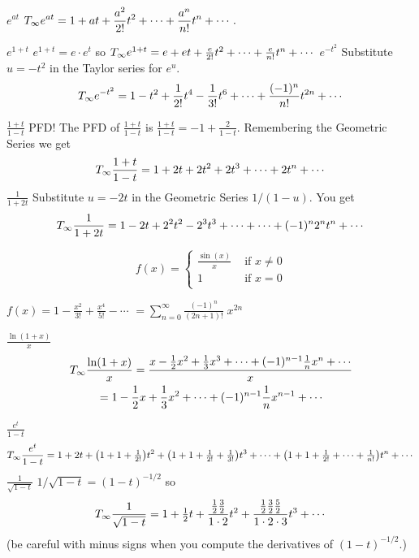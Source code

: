 \begin{multicols}{2}
\problem \(\displaystyle e^{at} \) %
\answer %
\(\displaystyle T_{\infty} e^{at} = 1 + at + \frac{a^2}{2!}t^2 + \cdots +
\frac{a^n}{n!}t^n+\cdots .\)
\endanswer

\problem \(\displaystyle e^{1+t}\) %
\answer %
$e^{1+t} = e\cdot e^t$ so $T_{\infty} e^{1+t} = e + et + \frac e{2!} t^2 +
\cdots + \frac{e}{n!}t^n + \cdots$
\endanswer
\problem \(\displaystyle e^{-t^2}\) %
\answer %
Substitute $u=-t^2$ in the Taylor series for $e^u$.
\[
T_{\infty} e^{-t^2} = 1-t^2+\frac1{2!}t^4-\frac1{3!}t^6+\cdots+
\frac{(-1)^n}{n!}t^{2n} + \cdots
\]
\endanswer

\problem \(\displaystyle \frac{1+t}{1-t} \) %
\answer %
PFD!  The PFD of $\frac{1+t}{1-t}$ is $\frac{1+t}{1-t} = -1 +
\frac2{1-t}$.  Remembering the Geometric Series we  get
\[
T_{\infty} \frac{1+t}{1-t} = 1 + 2t + 2t^2+2t^3+\cdots +2t^n+\cdots
\]
\endanswer
\problem \(\displaystyle \frac1{1+2t}\) %
\answer %
Substitute $u=-2t$ in the Geometric Series $1/(1-u)$.  You get
\[
T_{\infty} \frac1{1+2t} = 1-2t+2^2t^2-2^3t^3 + \cdots + \cdots + (-1)^n2^n t^n
+\cdots
\]
\endanswer

\problem %
$$f(x)=\left\{
\begin{array}{cl}
\frac{\sin(x)}{x} & \mbox{ if $x\neq 0$} \\ 
1 & \mbox{ if $x=0$} \\  
\end{array}\right.$$

\answer $f(x)=1-\frac{x^2}{3!}+ \frac{x^4}{5!}-\cdots$ %
$=\sum_{n=0}^\infty \frac{(-1)^n}{(2n+1)!}\;{x^{2n}}$
\endanswer

\problem \(\displaystyle \frac{\ln (1+x)}{x}\) %
\answer %
\begin{multline*}
  T_{\infty}\frac{\ln (1+x)}{x} =
  \frac{x-\frac12x^2+\frac13x^3+\cdots+(-1)^{n-1}\frac1nx^n+\cdots}{x}\\
  = 1-\frac12 x +\frac13 x^2 + \cdots + (-1)^{n-1}\frac1nx^{n-1}+\cdots
\end{multline*}
\endanswer

\problem \(\displaystyle \frac{e^t}{1-t} \) %
\answer %
\[
T_{\infty} \frac{e^t}{1-t} = 1 + 2t + \bigl(1+1+\tfrac1{2!}\bigr)t^2
+\bigl(1+1+\tfrac1{2!}+\tfrac1{3!}\bigr)t^3 +
\cdots+\bigl(1+1+\tfrac1{2!}+\cdots +\tfrac1{n!}\bigr)t^n+\cdots
\]
\endanswer
\problem\label{pblm:for-the-arcsine} \(\displaystyle\frac1{\sqrt{1-t}}\) %
\answer %
$1/\sqrt{1-t} = (1-t)^{-1/2}$ so
\[
T_{\infty}\frac1{\sqrt{1-t}} = 1 +\tfrac12 t + \frac{\tfrac12 \tfrac32}{1\cdot
2} t^2 +\frac{\tfrac12 \tfrac32 \tfrac52}{1\cdot 2\cdot 3}t^3+\cdots
\]
(be careful with minus signs when you compute the derivatives of
$(1-t)^{-1/2}$.)


\end{multicols}
